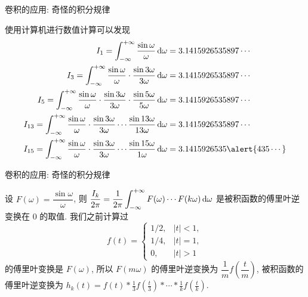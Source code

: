 \begin{frame}{卷积的应用: 奇怪的积分规律}
	\begin{example}
		使用计算机进行数值计算可以发现
		\begin{align*}
			I_1=\int_{-\infty}^{+\infty}\frac{\sin \omega}{\omega}\diff\omega&=3.1415926535897\cdots\\
			I_3=\int_{-\infty}^{+\infty}\frac{\sin \omega}{\omega}\cdot \frac{\sin 3\omega}{3\omega}\diff\omega&=3.1415926535897\cdots\\
			I_5=\int_{-\infty}^{+\infty}\frac{\sin \omega}{\omega}\cdot \frac{\sin 3\omega}{3\omega}\cdot
			\frac{\sin 5\omega}{5\omega}\diff\omega&=3.1415926535897\cdots\\
			I_{13}=\int_{-\infty}^{+\infty}\frac{\sin \omega}{\omega}\cdot \frac{\sin 3\omega}{3\omega}\cdots
			\frac{\sin 13\omega}{13\omega}\diff\omega&=3.1415926535897\cdots\\
			I_{15}=\int_{-\infty}^{+\infty}\frac{\sin \omega}{\omega}\cdot \frac{\sin 3\omega}{3\omega}\cdots
			\frac{\sin 15\omega}{1\omega}\diff\omega&=3.1415926535\alert{435\cdots}
		\end{align*}
	\end{example}
\end{frame}


\begin{frame}{卷积的应用: 奇怪的积分规律}
	\begin{solution}
		设 $F(\omega)=\dfrac{\sin\omega}{\omega}$, 则
		$\displaystyle\frac{I_k}{2\pi}=\frac1{2\pi}\int_{-\infty}^{+\infty}F(\omega)\cdots F(k\omega)\,\mathrm{d}\omega$ 是被积函数的傅里叶逆变换在 $0$ 的取值.
		我们之前计算过
		\[f(t)=\begin{cases}
			1/2, & |t|<1,\\
			1/4, & |t|=1,\\
			0, & |t|>1
		\end{cases}\]
		的傅里叶变换是 $F(\omega)$, 所以 $F(m\omega)$ 的傅里叶逆变换为 $\dfrac1mf(\dfrac tm)$, 
		被积函数的傅里叶逆变换为
		$\displaystyle h_k(t)=f(t)\ast \frac13f(\frac t3)\ast\cdots\ast \frac1 kf(\frac tk)$.
	\end{solution}
	\end{frame}


